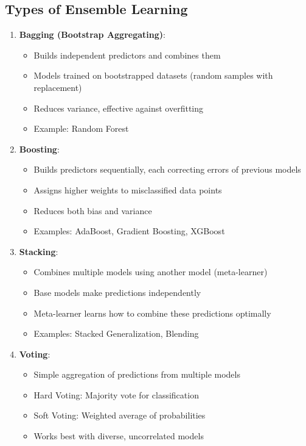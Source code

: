 \documentclass[
  letterpaper,
  DIV=11,
  numbers=noendperiod]{scrreprt}
\providecommand{\tightlist}{%
  \setlength{\itemsep}{0pt}\setlength{\parskip}{0pt}}\usepackage{longtable,booktabs,array}
\begin{document}
\subsection{Types of Ensemble
Learning}\label{types-of-ensemble-learning}

\begin{enumerate}
\def\labelenumi{\arabic{enumi}.}
\tightlist
\item
  \textbf{Bagging (Bootstrap Aggregating)}:

  \begin{itemize}
  \tightlist
  \item
    Builds independent predictors and combines them
  \item
    Models trained on bootstrapped datasets (random samples with
    replacement)
  \item
    Reduces variance, effective against overfitting
  \item
    Example: Random Forest
  \end{itemize}
\item
  \textbf{Boosting}:

  \begin{itemize}
  \tightlist
  \item
    Builds predictors sequentially, each correcting errors of previous
    models
  \item
    Assigns higher weights to misclassified data points
  \item
    Reduces both bias and variance
  \item
    Examples: AdaBoost, Gradient Boosting, XGBoost
  \end{itemize}
\item
  \textbf{Stacking}:

  \begin{itemize}
  \tightlist
  \item
    Combines multiple models using another model (meta-learner)
  \item
    Base models make predictions independently
  \item
    Meta-learner learns how to combine these predictions optimally
  \item
    Examples: Stacked Generalization, Blending
  \end{itemize}
\item
  \textbf{Voting}:

  \begin{itemize}
  \tightlist
  \item
    Simple aggregation of predictions from multiple models
  \item
    Hard Voting: Majority vote for classification
  \item
    Soft Voting: Weighted average of probabilities
  \item
    Works best with diverse, uncorrelated models
  \end{itemize}
\end{enumerate}
\end{document}
